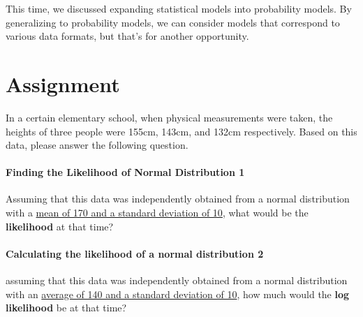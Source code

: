 \documentclass{ltjsbook}
\begin{document}


This time, we discussed expanding statistical models into probability models. By generalizing to probability models, we can consider models that correspond to various data formats, but that's for another opportunity.

\section{Assignment}
In a certain elementary school, when physical measurements were taken, the heights of three people were 155cm, 143cm, and 132cm respectively. Based on this data, please answer the following question.
\paragraph{Finding the Likelihood of Normal Distribution 1} Assuming that this data was independently obtained from a normal distribution with a \underline{mean of 170 and a standard deviation of 10}, what would be the \textbf{likelihood} at that time?
\paragraph{Calculating the likelihood of a normal distribution 2} assuming that this data was independently obtained from a normal distribution with an \underline{average of 140 and a standard deviation of 10}, how much would the \textbf{log likelihood} be at that time?
\end{document}
